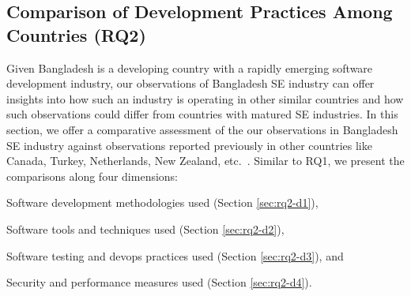 \subsection{Comparison of Development Practices Among Countries (RQ2)}
\label{RQ2}
Given Bangladesh is a developing country with a rapidly emerging software development industry, our observations of Bangladesh SE industry can 
offer insights into how such an industry is operating in other similar countries and how such observations 
could differ from countries with matured SE industries. In this section, we offer a comparative assessment of the 
our observations in Bangladesh SE industry against observations reported previously in other countries like 
Canada, Turkey, Netherlands, New Zealand, etc.~\citep{Garousi2013, Garousi2015, Vonken2012, Wang2018}. 
Similar to RQ1, we present the comparisons along four dimensions: \begin{inparaenum}[D1.]
  \item Software development methodologies used (Section \ref{sec:rq2-d1}), 
  \item Software tools and techniques used (Section \ref{sec:rq2-d2}),
\item Software testing and devops practices used (Section \ref{sec:rq2-d3}), and
\item Security and performance measures used (Section \ref{sec:rq2-d4}). 
\end{inparaenum}
%   
% 
% 




% 





% 
% 
